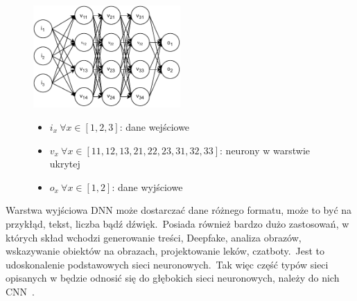 \begin{figure}[H]
    \centering
    \includegraphics[width=0.5\textwidth]{images/deep-neural-network}
    \begin{itemize}
        \item[] $i_x \  \forall x \in [1, 2, 3]$: dane wejściowe
        \item[] $v_x \ \forall x \in [11, 12, 13, 21, 22, 23, 31, 32, 33]$: neurony w warstwie ukrytej
        \item[] $o_x \ \forall x \in [1, 2]$: dane wyjściowe
    \end{itemize}
    \label{fig:deep-learn}
\end{figure}

Warstwa wyjściowa DNN może dostarczać dane różnego formatu, może to być na przykłąd, tekst, liczba bądź dźwięk.\ Posiada również bardzo dużo zastosowań, w których skład wchodzi generowanie treści, Deepfake, analiza obrazów, wskazywanie obiektów na obrazach, projektowanie leków, czatboty.\ Jest to udoskonalenie podstawowych sieci neuronowych.\ Tak więc część typów sieci opisanych w  będzie odnosić się do głębokich sieci neuronowych, należy do nich CNN~\cite{MicrosoftDeep2023}.